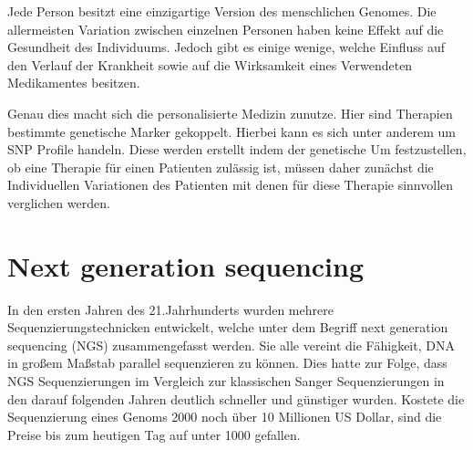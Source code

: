 Jede Person besitzt eine einzigartige Version des menschlichen Genomes. Die allermeisten Variation zwischen einzelnen Personen haben keine Effekt auf die Gesundheit des Individuums. Jedoch gibt es einige wenige, welche Einfluss auf den Verlauf der Krankheit sowie auf die Wirksamkeit eines Verwendeten Medikamentes besitzen. 

Genau dies macht sich die personalisierte Medizin zunutze. 
Hier sind Therapien bestimmte genetische Marker gekoppelt.
Hierbei kann es sich unter anderem um SNP Profile handeln.
Diese werden erstellt indem der genetische 
Um festzustellen, ob eine Therapie für einen Patienten zulässig ist, müssen daher zunächst die Individuellen Variationen des Patienten mit denen für diese Therapie sinnvollen verglichen werden.


\section{Next generation sequencing}
In den ersten Jahren des 21.Jahrhunderts wurden mehrere Sequenzierungstechnicken entwickelt, welche unter dem Begriff next generation sequencing (NGS) zusammengefasst werden.
Sie alle vereint die Fähigkeit, DNA in großem Maßstab parallel sequenzieren zu können. 
Dies hatte zur Folge, dass NGS Sequenzierungen im Vergleich zur klassischen Sanger Sequenzierungen in den darauf folgenden Jahren deutlich schneller und günstiger wurden.
Kostete die Sequenzierung eines Genoms 2000 noch über 10 Millionen US Dollar, sind die Preise bis zum heutigen Tag auf unter 1000 gefallen.
  



